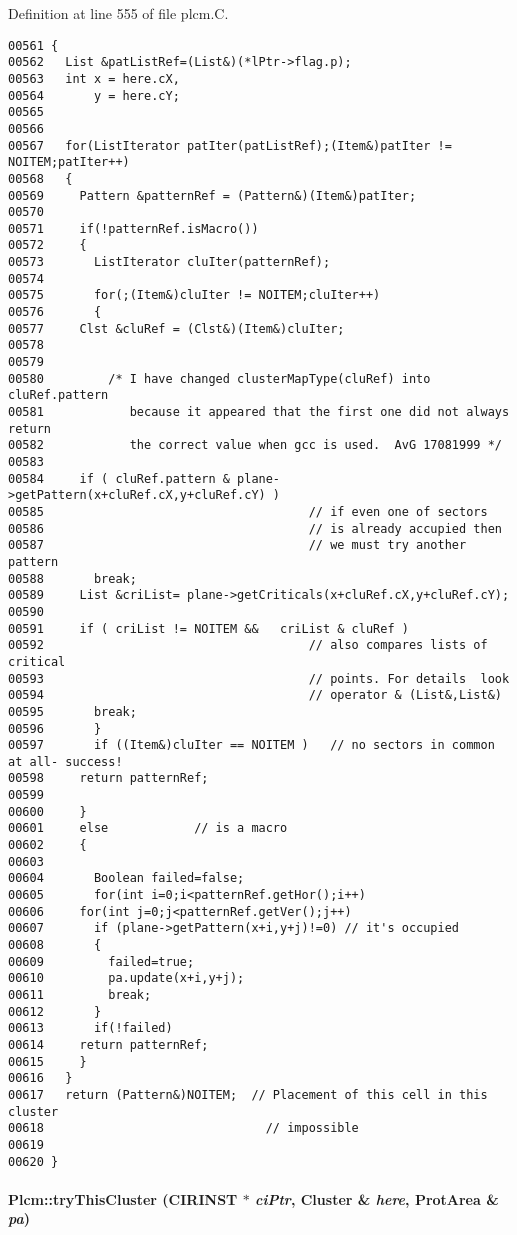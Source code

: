 Definition at line 555 of file plcm.C.\small\begin{verbatim}00561 {
00562   List &patListRef=(List&)(*lPtr->flag.p);
00563   int x = here.cX,
00564       y = here.cY;
00565 
00566 
00567   for(ListIterator patIter(patListRef);(Item&)patIter != NOITEM;patIter++)
00568   {
00569     Pattern &patternRef = (Pattern&)(Item&)patIter;
00570 
00571     if(!patternRef.isMacro())
00572     {
00573       ListIterator cluIter(patternRef);
00574       
00575       for(;(Item&)cluIter != NOITEM;cluIter++)
00576       {
00577     Clst &cluRef = (Clst&)(Item&)cluIter;
00578     
00579     
00580         /* I have changed clusterMapType(cluRef) into cluRef.pattern
00581            because it appeared that the first one did not always return
00582            the correct value when gcc is used.  AvG 17081999 */
00583 
00584     if ( cluRef.pattern & plane->getPattern(x+cluRef.cX,y+cluRef.cY) )
00585                                     // if even one of sectors
00586                                     // is already accupied then
00587                                     // we must try another pattern
00588       break;
00589     List &criList= plane->getCriticals(x+cluRef.cX,y+cluRef.cY);
00590     
00591     if ( criList != NOITEM &&   criList & cluRef )
00592                                     // also compares lists of critical
00593                                     // points. For details  look
00594                                     // operator & (List&,List&)
00595       break;
00596       }
00597       if ((Item&)cluIter == NOITEM )   // no sectors in common at all- success!
00598     return patternRef;
00599       
00600     }
00601     else            // is a macro
00602     {
00603 
00604       Boolean failed=false;
00605       for(int i=0;i<patternRef.getHor();i++)
00606     for(int j=0;j<patternRef.getVer();j++)
00607       if (plane->getPattern(x+i,y+j)!=0) // it's occupied
00608       {
00609         failed=true;
00610         pa.update(x+i,y+j);
00611         break;
00612       }
00613       if(!failed)
00614     return patternRef;
00615     }
00616   }
00617   return (Pattern&)NOITEM;  // Placement of this cell in this cluster
00618                               // impossible
00619 
00620 }
\end{verbatim}\normalsize 
\label{Plcm_c10}
\paragraph{ Plcm::try\-This\-Cluster (CIRINST $\ast$ {\em ci\-Ptr}, {\bf Cluster} \& {\em here}, {\bf Prot\-Area} \& {\em pa})\hspace{0.3cm}{\tt  [private]}}\hfill



